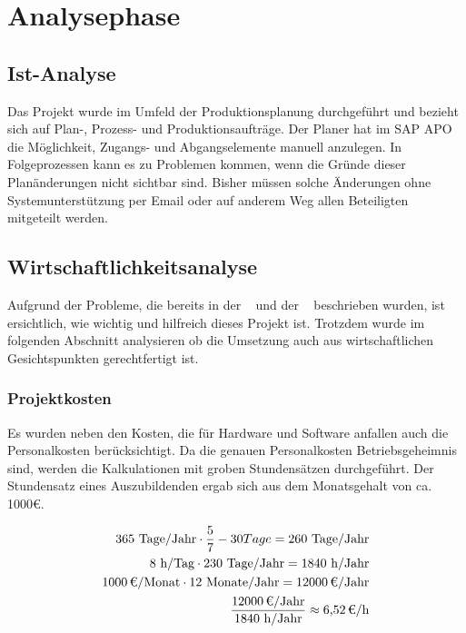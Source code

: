 \section{Analysephase} 
\label{sec:Analysephase}

\subsection{Ist-Analyse} 
\label{sec:IstAnalyse}
Das Projekt wurde im Umfeld der Produktionsplanung durchgeführt und bezieht sich auf Plan-, Prozess- und Produktionsaufträge. Der Planer hat im SAP \ac{APO} die	Möglichkeit, Zugangs- und Abgangselemente manuell anzulegen. In Folgeprozessen kann es zu Problemen kommen, wenn die Gründe dieser Planänderungen nicht sichtbar sind. Bisher müssen solche Änderungen ohne Systemunterstützung per Email oder auf anderem Weg allen Beteiligten mitgeteilt werden.

\subsection{Wirtschaftlichkeitsanalyse}
\label{sec:Wirtschaftlichkeitsanalyse}
Aufgrund der Probleme, die bereits in der ~ und der ~ beschrieben wurden, ist ersichtlich, wie wichtig und hilfreich dieses Projekt ist. Trotzdem wurde im folgenden Abschnitt analysieren ob die Umsetzung auch aus wirtschaftlichen Gesichtspunkten gerechtfertigt ist.

\subsubsection{Projektkosten}
\label{sec:Projektkosten}
Es wurden neben den Kosten, die für Hardware und Software anfallen auch die Personalkosten berücksichtigt.
Da die genauen Personalkosten Betriebsgeheimnis sind, werden die Kalkulationen mit groben Stundensätzen durchgeführt. Der Stundensatz eines Auszubildenden ergab sich aus dem Monatsgehalt von ca. 1000€.
		
\begin{eqnarray}
	365 \mbox{ Tage/Jahr} \cdot \frac{5}{7} - 30 Tage = 260 \mbox{ Tage/Jahr}\\
	8 \mbox{ h/Tag} \cdot 230 \mbox{ Tage/Jahr} = 1840 \mbox{ h/Jahr}\\
	\eur{1000}\mbox{/Monat} \cdot 12 \mbox{ Monate/Jahr} = \eur{12000} \mbox{/Jahr}\\
	\frac{\eur{12000} \mbox{/Jahr}}{1840 \mbox{ h/Jahr}} \approx \eur{6,52}\mbox{/h}
\end{eqnarray}
	
